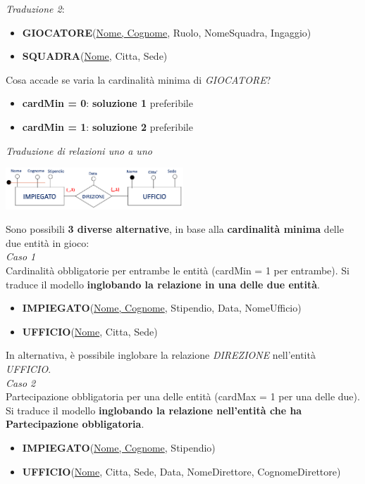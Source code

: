 \documentclass{article}
\begin{document}
\textit{Traduzione 2}:
\begin{itemize}[label={ }, leftmargin=1cm]
    \item \textbf{GIOCATORE}(\underline{Nome, Cognome}, Ruolo, NomeSquadra, Ingaggio)
    \item \textbf{SQUADRA}(\underline{Nome}, Citta, Sede)
\end{itemize}
Cosa accade se varia la cardinalità minima di \textit{GIOCATORE}?
\begin{itemize}[label={-}, leftmargin=1cm]
    \item \textbf{cardMin = 0}: \textbf{soluzione 1} preferibile
    \item \textbf{cardMin = 1}: \textbf{soluzione 2} preferibile\\
\end{itemize}
\textit{Traduzione di relazioni uno a uno}\\
\begin{center}
    \includegraphics[width=0.5\textwidth]{foto 18.png}
\end{center}
Sono possibili \textbf{3 diverse alternative}, in base alla \textbf{cardinalità minima} delle due entità in gioco:\vspace{14pt}\\
\textit{Caso 1}\\
Cardinalità obbligatorie per entrambe le entità (cardMin = 1 per entrambe). Si traduce il modello \textbf{inglobando la relazione in una delle due entità}.
\begin{itemize}[label={ }, leftmargin=1cm]
    \item \textbf{IMPIEGATO}(\underline{Nome, Cognome}, Stipendio, Data, NomeUfficio)
    \item \textbf{UFFICIO}(\underline{Nome}, Citta, Sede)
\end{itemize}
In alternativa, è possibile inglobare la relazione \textit{DIREZIONE} nell'entità \textit{UFFICIO}.\vspace{14pt}\\
\textit{Caso 2}\\
Partecipazione obbligatoria per una delle entità (cardMax = 1 per una delle due). Si traduce il modello \textbf{inglobando la relazione nell'entità che ha Partecipazione obbligatoria}.
\begin{itemize}[label={ }, leftmargin=1cm]
    \item \textbf{IMPIEGATO}(\underline{Nome, Cognome}, Stipendio)
    \item \textbf{UFFICIO}(\underline{Nome}, Citta, Sede, Data, NomeDirettore, CognomeDirettore)\\
\end{itemize}
\end{document}
